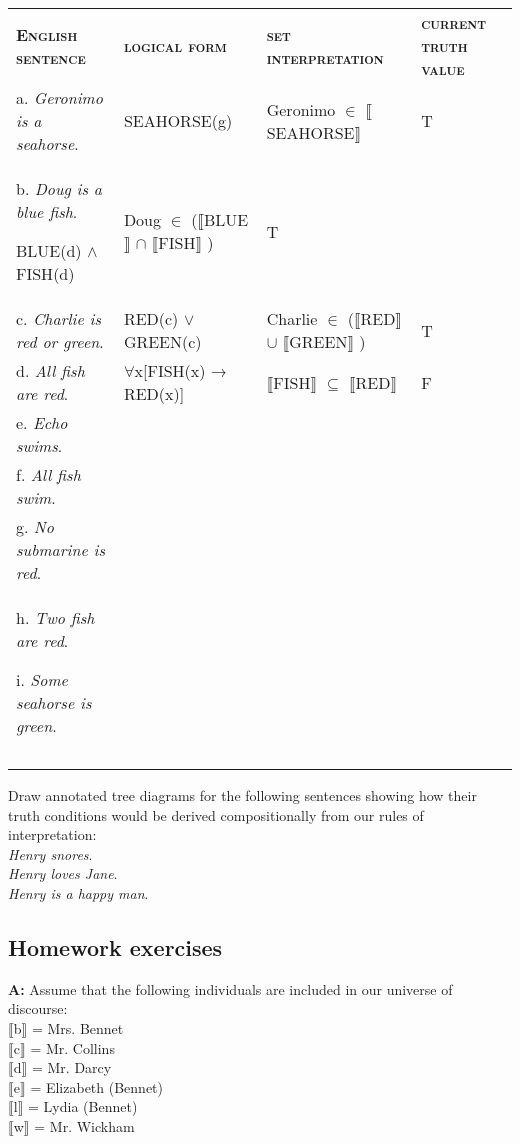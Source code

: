 \begin{tabularx}{\textwidth}{XXXX}
\lsptoprule

\bfseries\scshape English sentence & \bfseries\scshape logical form & \bfseries\scshape set interpretation & \textbf{\textsc{current truth value}}\\
a. \textit{Geronimo is a seahorse}. & SEAHORSE(g) & Geronimo ${\in}$ \textsc{$\llbracket$}SEAHORSE$\rrbracket$  & T\\
b. \textit{Doug is a blue fish}.

BLUE(d) $\wedge$ \textsc{FISH}(d) & Doug ${\in}$ (\textsc{$\llbracket$}BLUE$\rrbracket$  ${\cap}$ \textsc{$\llbracket$FISH}$\rrbracket$ ) & T & \\
c. \textit{Charlie is red or green}. & RED(c) $\vee$ GREEN(c) & Charlie ${\in}$ (\textsc{$\llbracket$}RED$\rrbracket$  ${\cup}$ \textsc{$\llbracket$}GREEN$\rrbracket$ ) & T\\
d. \textit{All fish are red}. & ${\forall}$x[\textsc{FISH}(x) → RED(x)] & \textsc{$\llbracket$FISH}$\rrbracket$  ${\subseteq}$ \textsc{$\llbracket$}RED$\rrbracket$  & F\\
e. \textit{Echo swims}. &  &  & \\
f. \textit{All fish swim}. &  &  & \\
g. \textit{No submarine is red}. &  &  & \\
h. \textit{Two fish are red}.

i. \textit{Some seahorse is green}. &  &  & \\
&  &  & \\
\lspbottomrule
\end{tabularx}

\ea \label{ex:13.}%
    \label{ex:key:3}
    Draw annotated tree diagrams for the following sentences showing how their truth conditions would be derived compositionally from our rules of interpretation:\\
\ea \label{ex:13.} \textit{Henry snores}.\\
\ex \textit{Henry loves Jane}.\\
\ex \textit{Henry is a happy man}.
                       \z
    \z

\subsection*{Homework exercises}
\begin{stylepoints}
\textbf{A:} Assume that the following individuals are included in our universe of discourse:\\
{}$\llbracket$b$\rrbracket$  = Mrs. Bennet\\
{}$\llbracket$c$\rrbracket$  = Mr. Collins\\
{}$\llbracket$d$\rrbracket$  = Mr. Darcy\\
{}$\llbracket$e$\rrbracket$  = Elizabeth (Bennet)\\
{}$\llbracket$l$\rrbracket$  = Lydia (Bennet)\\
{}$\llbracket$w$\rrbracket$  = Mr. Wickham
\end{stylepoints}

